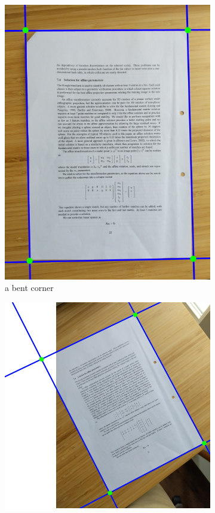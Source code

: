 \documentclass[bibliography=totoc]{scrartcl}
\begin{document}
\begin{figure}[H]
	\centering
	\begin{subfigure}[t]{0.3\linewidth}
		\includegraphics[width=\linewidth]{imgs/not_working/bent_corner_hough.jpg}
		\caption{a bent corner}
	\end{subfigure}
	\hspace{0.1\linewidth}
	\begin{subfigure}[t]{0.4\linewidth}
		\includegraphics[width=\linewidth]{imgs/not_working/missing_corner_hough.jpg}

\end{subfigure}
\end{figure}
\end{document}
